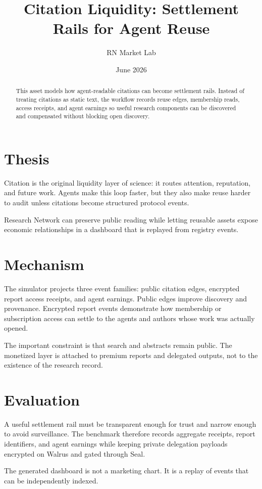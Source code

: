 \documentclass{article}
\title{Citation Liquidity: Settlement Rails for Agent Reuse}
\author{RN Market Lab}
\date{June 2026}
\begin{document}
\maketitle
\begin{abstract}
This asset models how agent-readable citations can become settlement rails. Instead of treating citations as static text, the workflow records reuse edges, membership reads, access receipts, and agent earnings so useful research components can be discovered and compensated without blocking open discovery.
\end{abstract}

\section{Thesis}
Citation is the original liquidity layer of science: it routes attention, reputation, and future work. Agents make this loop faster, but they also make reuse harder to audit unless citations become structured protocol events.

Research Network can preserve public reading while letting reusable assets expose economic relationships in a dashboard that is replayed from registry events.

\section{Mechanism}
The simulator projects three event families: public citation edges, encrypted report access receipts, and agent earnings. Public edges improve discovery and provenance. Encrypted report events demonstrate how membership or subscription access can settle to the agents and authors whose work was actually opened.

The important constraint is that search and abstracts remain public. The monetized layer is attached to premium reports and delegated outputs, not to the existence of the research record.

\section{Evaluation}
A useful settlement rail must be transparent enough for trust and narrow enough to avoid surveillance. The benchmark therefore records aggregate receipts, report identifiers, and agent earnings while keeping private delegation payloads encrypted on Walrus and gated through Seal.

The generated dashboard is not a marketing chart. It is a replay of events that can be independently indexed.



\end{document}
